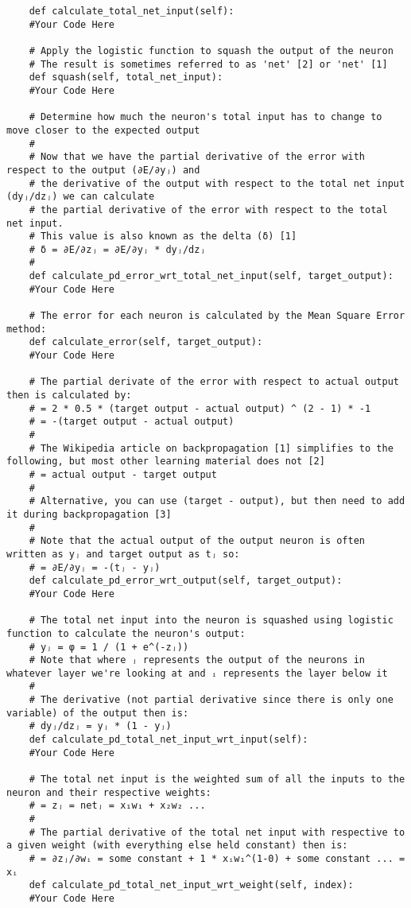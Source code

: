 ﻿\documentclass[a4paper, 11pt]{article}
\begin{document}
\begin{enumerate}
\begin{lstlisting}
    def calculate_total_net_input(self):
    #Your Code Here

    # Apply the logistic function to squash the output of the neuron
    # The result is sometimes referred to as 'net' [2] or 'net' [1]
    def squash(self, total_net_input):
    #Your Code Here

    # Determine how much the neuron's total input has to change to move closer to the expected output
    #
    # Now that we have the partial derivative of the error with respect to the output (∂E/∂yⱼ) and
    # the derivative of the output with respect to the total net input (dyⱼ/dzⱼ) we can calculate
    # the partial derivative of the error with respect to the total net input.
    # This value is also known as the delta (δ) [1]
    # δ = ∂E/∂zⱼ = ∂E/∂yⱼ * dyⱼ/dzⱼ
    #
    def calculate_pd_error_wrt_total_net_input(self, target_output):
    #Your Code Here

    # The error for each neuron is calculated by the Mean Square Error method:
    def calculate_error(self, target_output):
    #Your Code Here

    # The partial derivate of the error with respect to actual output then is calculated by:
    # = 2 * 0.5 * (target output - actual output) ^ (2 - 1) * -1
    # = -(target output - actual output)
    #
    # The Wikipedia article on backpropagation [1] simplifies to the following, but most other learning material does not [2]
    # = actual output - target output
    #
    # Alternative, you can use (target - output), but then need to add it during backpropagation [3]
    #
    # Note that the actual output of the output neuron is often written as yⱼ and target output as tⱼ so:
    # = ∂E/∂yⱼ = -(tⱼ - yⱼ)
    def calculate_pd_error_wrt_output(self, target_output):
    #Your Code Here

    # The total net input into the neuron is squashed using logistic function to calculate the neuron's output:
    # yⱼ = φ = 1 / (1 + e^(-zⱼ))
    # Note that where ⱼ represents the output of the neurons in whatever layer we're looking at and ᵢ represents the layer below it
    #
    # The derivative (not partial derivative since there is only one variable) of the output then is:
    # dyⱼ/dzⱼ = yⱼ * (1 - yⱼ)
    def calculate_pd_total_net_input_wrt_input(self):
    #Your Code Here

    # The total net input is the weighted sum of all the inputs to the neuron and their respective weights:
    # = zⱼ = netⱼ = x₁w₁ + x₂w₂ ...
    #
    # The partial derivative of the total net input with respective to a given weight (with everything else held constant) then is:
    # = ∂zⱼ/∂wᵢ = some constant + 1 * xᵢw₁^(1-0) + some constant ... = xᵢ
    def calculate_pd_total_net_input_wrt_weight(self, index):
    #Your Code Here


\end{lstlisting}
\end{enumerate}
\end{document}
